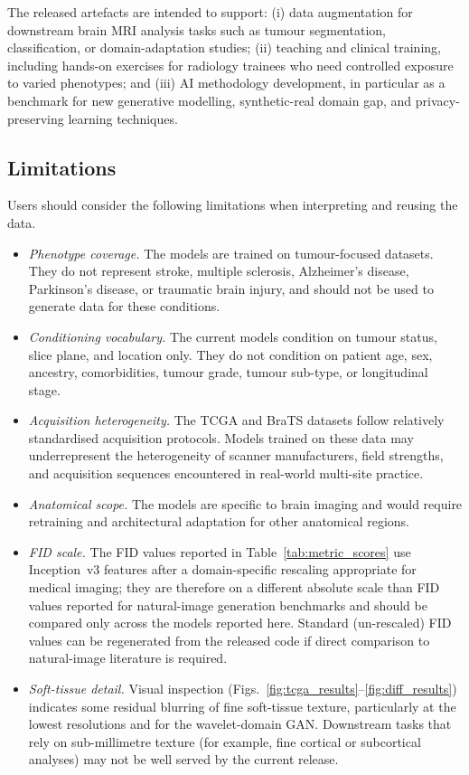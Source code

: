 \documentclass[11pt]{article}
\begin{document}
The released artefacts are intended to support: (i) data augmentation for downstream brain MRI analysis tasks such as tumour segmentation, classification, or domain-adaptation studies; (ii) teaching and clinical training, including hands-on exercises for radiology trainees who need controlled exposure to varied phenotypes; and (iii) AI methodology development, in particular as a benchmark for new generative modelling, synthetic-real domain gap, and privacy-preserving learning techniques.

\subsection*{Limitations}

Users should consider the following limitations when interpreting and reusing the data.
\begin{itemize}
  \item \emph{Phenotype coverage.} The models are trained on tumour-focused datasets. They do not represent stroke, multiple sclerosis, Alzheimer's disease, Parkinson's disease, or traumatic brain injury, and should not be used to generate data for these conditions.
  \item \emph{Conditioning vocabulary.} The current models condition on tumour status, slice plane, and location only. They do not condition on patient age, sex, ancestry, comorbidities, tumour grade, tumour sub-type, or longitudinal stage.
  \item \emph{Acquisition heterogeneity.} The TCGA and BraTS datasets follow relatively standardised acquisition protocols. Models trained on these data may underrepresent the heterogeneity of scanner manufacturers, field strengths, and acquisition sequences encountered in real-world multi-site practice.
  \item \emph{Anatomical scope.} The models are specific to brain imaging and would require retraining and architectural adaptation for other anatomical regions.
  \item \emph{FID scale.} The FID values reported in Table~\ref{tab:metric_scores} use Inception~v3 features after a domain-specific rescaling appropriate for medical imaging; they are therefore on a different absolute scale than FID values reported for natural-image generation benchmarks and should be compared only across the models reported here. Standard (un-rescaled) FID values can be regenerated from the released code if direct comparison to natural-image literature is required.
  \item \emph{Soft-tissue detail.} Visual inspection (Figs.~\ref{fig:tcga_results}--\ref{fig:diff_results}) indicates some residual blurring of fine soft-tissue texture, particularly at the lowest resolutions and for the wavelet-domain GAN. Downstream tasks that rely on sub-millimetre texture (for example, fine cortical or subcortical analyses) may not be well served by the current release.

\end{itemize}
\end{document}
